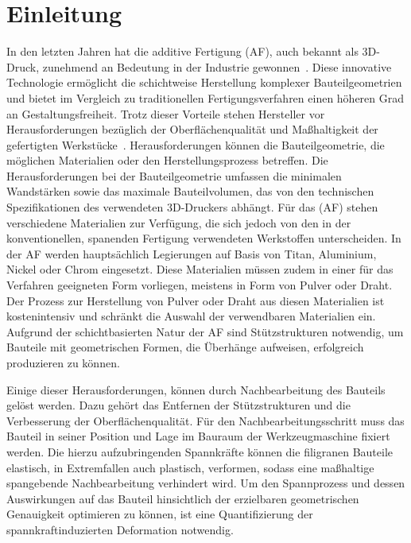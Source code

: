 \chapter{Einleitung}

In den letzten Jahren hat die additive Fertigung (AF), auch bekannt als 3D-Druck, 
zunehmend an Bedeutung in der Industrie gewonnen~\cite{JADHAV20222094}. 
Diese innovative Technologie 
ermöglicht die schichtweise Herstellung komplexer Bauteilgeometrien und bietet im 
Vergleich zu traditionellen Fertigungsverfahren einen höheren Grad an 
Gestaltungsfreiheit. Trotz dieser Vorteile stehen Hersteller vor 
Herausforderungen bezüglich der Oberflächenqualität und Maßhaltigkeit 
der gefertigten Werkstücke~\cite{SCHNECK201919}.
Herausforderungen können die Bauteilgeometrie, die möglichen Materialien oder 
den Herstellungsprozess betreffen.
Die Herausforderungen bei der Bauteilgeometrie umfassen die minimalen 
Wandstärken sowie das maximale Bauteilvolumen, das von den technischen 
Spezifikationen des verwendeten 3D-Druckers abhängt. Für das (AF) stehen 
verschiedene Materialien zur Verfügung, 
die sich jedoch von den in der konventionellen, spanenden Fertigung 
verwendeten Werkstoffen unterscheiden. In der AF werden hauptsächlich Legierungen 
auf Basis von Titan, Aluminium, Nickel oder Chrom eingesetzt. Diese Materialien
müssen zudem in einer für das Verfahren geeigneten Form vorliegen, 
meistens in Form von Pulver oder Draht. Der Prozess zur Herstellung von 
Pulver oder Draht aus diesen Materialien ist kostenintensiv und schränkt
die Auswahl der verwendbaren Materialien ein. Aufgrund der 
schichtbasierten Natur der AF sind Stützstrukturen 
notwendig, um Bauteile mit geometrischen Formen, die Überhänge aufweisen, 
erfolgreich produzieren zu können. \label{drawbacks_af}
\cite{Vranic.2017}

Einige dieser Herausforderungen, können durch Nachbearbeitung des Bauteils 
gelöst werden. Dazu gehört das Entfernen der Stützstrukturen und die Verbesserung
der Oberflächenqualität.
Für den Nachbearbeitungsschritt muss das Bauteil in seiner Position und Lage im Bauraum
der Werkzeugmaschine fixiert werden. Die hierzu aufzubringenden Spannkräfte 
können die filigranen Bauteile elastisch, in Extremfallen auch plastisch, verformen, 
sodass eine maßhaltige spangebende Nachbearbeitung verhindert wird. 
Um den Spannprozess und dessen Auswirkungen auf das Bauteil hinsichtlich 
der erzielbaren geometrischen Genauigkeit optimieren zu
können, ist eine Quantifizierung der spannkraftinduzierten Deformation notwendig.~\cite{newMethod}

